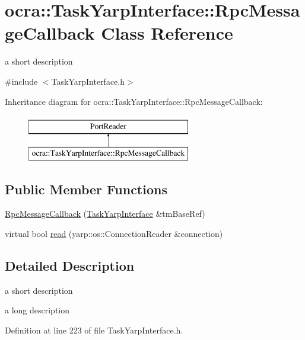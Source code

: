 \hypertarget{classocra_1_1TaskYarpInterface_1_1RpcMessageCallback}{}\section{ocra\+:\+:Task\+Yarp\+Interface\+:\+:Rpc\+Message\+Callback Class Reference}
\label{classocra_1_1TaskYarpInterface_1_1RpcMessageCallback}


a short description  




{\ttfamily \#include $<$Task\+Yarp\+Interface.\+h$>$}

Inheritance diagram for ocra\+:\+:Task\+Yarp\+Interface\+:\+:Rpc\+Message\+Callback\+:\begin{figure}[H]
\begin{center}
\leavevmode
\includegraphics[height=2.000000cm]{d1/d1a/classocra_1_1TaskYarpInterface_1_1RpcMessageCallback}
\end{center}
\end{figure}
\subsection*{Public Member Functions}
\begin{DoxyCompactItemize}
\item 
\hyperlink{classocra_1_1TaskYarpInterface_1_1RpcMessageCallback_a2e2770ed9acd291947f2a96fd7bba1d9}{Rpc\+Message\+Callback} (\hyperlink{classocra_1_1TaskYarpInterface}{Task\+Yarp\+Interface} \&tm\+Base\+Ref)
\item 
virtual bool \hyperlink{classocra_1_1TaskYarpInterface_1_1RpcMessageCallback_a403b0136f2df7ec64af9906560ff113e}{read} (yarp\+::os\+::\+Connection\+Reader \&connection)
\end{DoxyCompactItemize}


\subsection{Detailed Description}
a short description 

a long description 

Definition at line 223 of file Task\+Yarp\+Interface.\+h.



